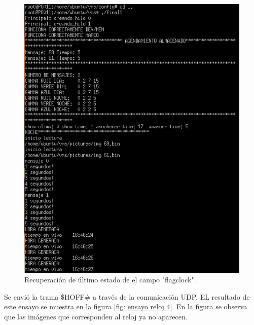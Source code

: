 \begin{figure}[htpb]
	\centering
	\includegraphics[scale=0.8]{Figures/pruebareloj3.png} 
	\caption{Recuperación de último estado de el campo "flagclock".}
	\label{fig: ensayo reloj 3}
\end{figure}

Se envió la trama \$HOFF\# a través de la comunicación UDP.  EL resultado de este ensayo se muestra en la figura \ref{fig: ensayo reloj 4}. En la figura se observa que las imágenes que corresponden al reloj ya no aparecen.


